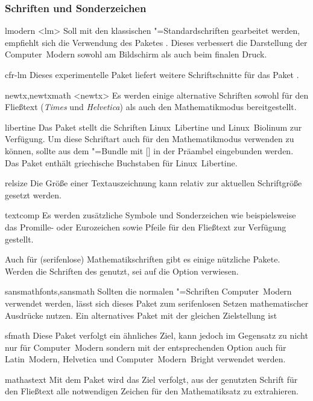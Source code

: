 \subsubsection{Schriften und Sonderzeichen}
\begin{packages}
\item[lmodern]<lm>
  Soll mit den klassischen "=Standardschriften gearbeitet werden, 
  empfiehlt sich die Verwendung des Paketes . Dieses 
  verbessert die Darstellung der Computer~Modern sowohl am Bildschirm als auch 
  beim finalen Druck.
\item[cfr-lm]
  Dieses experimentelle Paket liefert weitere Schriftschnitte für das Paket 
  .
\item[newtx,newtxmath]<newtx>
  Es werden einige alternative Schriften sowohl für den Fließtext 
  (\textit{Times} und \textit{Helvetica}) als auch den Mathematikmodus 
  bereitgestellt.
\item[libertine]
  Das Paket stellt die Schriften Linux~Libertine und Linux~Biolinum zur 
  Verfügung. Um diese Schriftart auch für den Mathematikmodus verwenden zu 
  können, sollte  aus dem "=Bundle mit 
  [] in der 
  Präambel eingebunden werden. Das Paket  enthält griechische 
  Buchstaben für Linux~Libertine.
\item[relsize]
  Die Größe einer Textauszeichnung kann relativ zur aktuellen Schriftgröße 
  gesetzt werden.
\item[textcomp]
  Es werden zusätzliche Symbole und Sonderzeichen wie beispielsweise das 
  Promille- oder Eurozeichen sowie Pfeile für den Fließtext zur Verfügung 
  gestellt.
\end{packages}
%
%
Auch für (serifenlose) Mathematikschriften gibt es einige nützliche Pakete. 
Werden die Schriften des \CDs genutzt, sei auf die Option  
verwiesen.
%
\begin{packages}
\item[sansmathfonts,sansmath]
  Sollten die normalen "=Schriften Computer~Modern verwendet 
  werden, lässt sich dieses Paket zum serifenlosen Setzen mathematischer 
  Ausdrücke nutzen. Ein alternatives Paket mit der gleichen Zielstellung ist 
\item[sfmath]
  Diese Paket verfolgt ein ähnliches Ziel, kann jedoch im Gegensatz zu 
   nicht nur für Computer~Modern sondern mit der 
  entsprechenden Option auch für Latin~Modern, Helvetica und 
  Computer~Modern~Bright verwendet werden.
\item[mathastext]
  Mit dem Paket wird das Ziel verfolgt, aus der genutzten Schrift für den 
  Fließtext alle notwendigen Zeichen für den Mathematiksatz zu extrahieren.
\end{packages}


